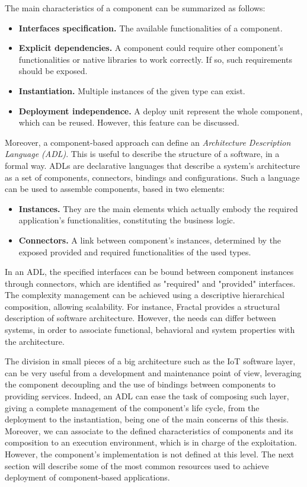 The main characteristics of a component can be summarized as follows:
\begin{itemize}
	\item \textbf{Interfaces specification.} The available functionalities of a component.
	\item \textbf{Explicit dependencies.} A component could require other component's functionalities or native libraries to work correctly.
	If so, such requirements should be exposed.
	\item \textbf{Instantiation.} Multiple instances of the given type can exist.
	\item \textbf{Deployment independence.} A deploy unit represent the whole component, which can be reused. However, this feature can be discussed.
\end{itemize}
Moreover, a component-based approach can define an \textit{Architecture Description Language (ADL)}.
This is useful to describe the structure of a software, in a formal way\cite{taylor2009architectural}\cite{len2003software}\cite{medvidovic2000classification}.
ADLs are declarative languages that describe a system's architecture as a set of components, connectors, bindings and configurations.
Such a language can be used to assemble components, based in two elements:

\begin{itemize}
	\item \textbf{Instances.} They are the main elements which actually embody the required application's functionalities, constituting the business logic.
	\item \textbf{Connectors.} A link between component's instances, determined by the exposed provided and required functionalities of the used types.
\end{itemize}

In an ADL, the specified interfaces can be bound between component instances through connectors, which are identified as "required" and "provided" interfaces.
The complexity management can be achieved using a descriptive hierarchical composition, allowing scalability.
For instance, Fractal\cite{bruneton2006fractal} provides a structural description of software architecture.
However, the needs can differ between systems, in order to associate functional, behavioral and system properties with the architecture.

The division in small pieces of a big architecture such as the IoT software layer, can be very useful from a development and maintenance point of view, leveraging the component decoupling and the use of bindings between components to providing services.
Indeed, an ADL can ease the task of composing such layer, giving a complete management of the component's life cycle, from the deployment to the instantiation, being one of the main concerns of this thesis.
Moreover, we can associate to the defined characteristics of components and its composition to an execution environment, which is in charge of the exploitation.
However, the component's implementation is not defined at this level.
The next section will describe some of the most common resources used to achieve deployment of component-based applications.

